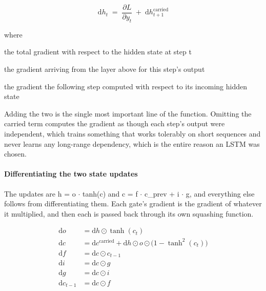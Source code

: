 \begin{equation}
\mathrm{d}h_t \;=\; \frac{\partial L}{\partial y_t} \;+\; \mathrm{d}h_{t+1}^{\mathrm{carried}}
\end{equation}

\noindent where
\begin{description}[leftmargin=2.4em,style=nextline,font=\normalfont\ttfamily]\setlength\itemsep{1pt}
  \item[{$\mathrm{d}h_t$}] \normalfont the total gradient with respect to the hidden state at step t
  \item[{$\frac{\partial L}{\partial y_t}$}] \normalfont the gradient arriving from the layer above for this step's output
  \item[{$\mathrm{d}h_{t+1}^{\mathrm{carried}}$}] \normalfont the gradient the following step computed with respect to its incoming hidden state
\end{description}
Adding the two is the single most important line of the function. Omitting the carried term computes the gradient as though each step's output were independent, which trains something that works tolerably on short sequences and never learns any long-range dependency, which is the entire reason an LSTM was chosen.


\paragraph{Differentiating the two state updates}
The updates are h = o $\cdot$ tanh(c) and c = f $\cdot$ c\_prev + i $\cdot$ g, and everything else follows from differentiating them. Each gate's gradient is the gradient of whatever it multiplied, and then each is passed back through its own squashing function.


\begin{equation}
\begin{aligned} \mathrm{d}o &= \mathrm{d}h \odot \tanh(c_t) \\[2pt] \mathrm{d}c &= \mathrm{d}c^{\mathrm{carried}} + \mathrm{d}h \odot o \odot \big(1 - \tanh^2(c_t)\big) \\[2pt] \mathrm{d}f &= \mathrm{d}c \odot c_{t-1} \\[2pt] \mathrm{d}i &= \mathrm{d}c \odot g \\[2pt] \mathrm{d}g &= \mathrm{d}c \odot i \\[2pt] \mathrm{d}c_{t-1} &= \mathrm{d}c \odot f \end{aligned}
\end{equation}

